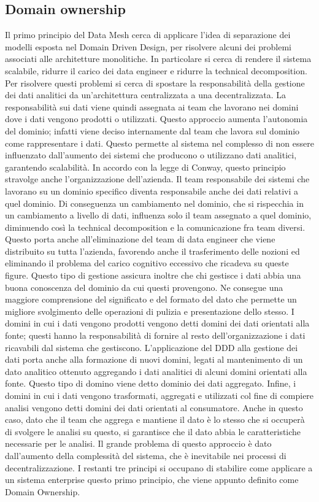 \documentclass[12pt]{report}
\begin{document}
\subsection{Domain ownership} \label{downership}
Il primo principio del Data Mesh cerca di applicare l'idea di separazione dei modelli esposta nel Domain Driven Design, per risolvere alcuni dei problemi associati alle architetture monolitiche.
In particolare si cerca di rendere il sistema scalabile, ridurre il carico dei data engineer e ridurre la technical decomposition.
Per risolvere questi problemi si cerca di spostare la responsabilità della gestione dei dati analitici da un'architettura centralizzata a una decentralizzata. 
La responsabilità sui dati viene quindi assegnata ai team che lavorano nei domini dove i dati vengono prodotti o utilizzati.
Questo approccio aumenta l'autonomia del dominio; infatti viene deciso internamente dal team che lavora sul dominio come rappresentare i dati.
Questo permette al sistema nel complesso di non essere influenzato dall'aumento dei sistemi che producono o utilizzano dati analitici, garantendo scalabilità.
In accordo con la legge di Conway, questo principio stravolge anche l'organizzazione dell'azienda.
Il team responsabile dei sistemi che lavorano su un dominio specifico diventa responsabile anche dei dati relativi a quel dominio.
Di conseguenza un cambiamento nel dominio, che si rispecchia in un cambiamento a livello di dati, influenza solo il team assegnato a quel dominio, diminuendo così la technical decomposition e la comunicazione fra team diversi.
Questo porta anche all'eliminazione del team di data engineer che viene distribuito su tutta l'azienda, favorendo anche il trasferimento delle nozioni ed eliminando il problema del carico cognitivo eccessivo che ricadeva su queste figure.
Questo tipo di gestione assicura inoltre che chi gestisce i dati abbia una buona conoscenza del dominio da cui questi provengono.
Ne consegue una maggiore comprensione del significato e del formato del dato che permette un migliore svolgimento delle operazioni di pulizia e presentazione dello stesso. 
I domini in cui i dati vengono prodotti vengono detti domini dei dati orientati alla fonte; questi hanno la responsabilità di fornire al resto dell'organizzazione i dati ricavabili dal sistema che gestiscono.
L'applicazione del DDD alla gestione dei dati porta anche alla formazione di nuovi domini, legati al mantenimento di un dato analitico ottenuto aggregando i dati analitici di alcuni domini orientati alla fonte.
Questo tipo di domino viene detto dominio dei dati aggregato.
Infine, i domini in cui i dati vengono trasformati, aggregati e utilizzati col fine di compiere analisi vengono detti domini dei dati orientati al consumatore. 
Anche in questo caso, dato che il team che aggrega e mantiene il dato è lo stesso che si occuperà di svolgere le analisi su questo, si garantisce che il dato abbia le caratteristiche necessarie per le analisi. 
Il grande problema di questo approccio è dato dall'aumento della complessità del sistema, che è inevitabile nei processi di decentralizzazione.
I restanti tre principi si occupano di stabilire come applicare a un sistema enterprise questo primo principio, che viene appunto definito come Domain Ownership.
\end{document}
